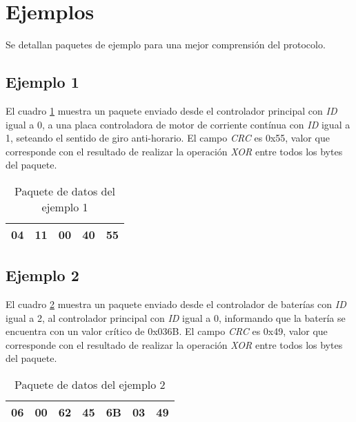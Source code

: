 \documentclass[a4paper,10pt]{article}
\begin{document}
\section{Ejemplos}
\label{ejemplos}

Se detallan paquetes de ejemplo para una mejor comprensi\'on del protocolo.

\subsection{Ejemplo 1}
\label{ejemplo1}

El cuadro \ref{paquete_ejemplo1} muestra un paquete enviado desde el controlador principal con \emph{ID} igual a 0,
a una placa controladora de motor de corriente cont\'inua con \emph{ID} igual a 1, seteando el sentido de giro anti-horario.
El campo \emph{CRC} es 0x55, valor que corresponde con el resultado de realizar la operaci\'on \emph{XOR} entre
todos los bytes del paquete.

\begin{table}[h]
\begin{center}
\begin{tabular}{|c|c|c|c|c|}
\hline
04 & 11 & 00 & 40 & 55 \\
\hline
\end{tabular}
\caption{Paquete de datos del ejemplo 1}
\label{paquete_ejemplo1}
\end{center}
\end{table}

\subsection{Ejemplo 2}
\label{ejemplo2}

El cuadro \ref{paquete_ejemplo2} muestra un paquete enviado desde el controlador de bater\'ias con \emph{ID} igual a 2,
al controlador principal con \emph{ID} igual a 0, informando que la bater\'ia se encuentra con un valor cr\'itico de 0x036B.
El campo \emph{CRC} es 0x49, valor que corresponde con el resultado de realizar la operaci\'on \emph{XOR} entre
todos los bytes del paquete.

\begin{table}[h]
\begin{center}
\begin{tabular}{|c|c|c|c|c|c|c|}
\hline
06 & 00 & 62 & 45 & 6B & 03 & 49 \\
\hline
\end{tabular}
\caption{Paquete de datos del ejemplo 2}
\label{paquete_ejemplo2}
\end{center}
\end{table}
\end{document}
